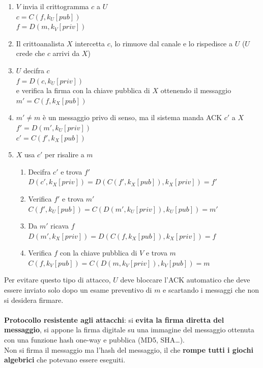 \documentclass[10pt]{book}
\begin{document}
\begin{enumerate}
	\item $V$ invia il crittogramma $c$ a $U$\\
	$c = C(f, k_U[pub])$\\
	$f = D(m, k_V[priv])$
	\item Il crittoanalista $X$ intercetta $c$, lo rimuove dal canale e lo rispedisce a $U$ ($U$ crede che $c$ arrivi da $X$)
	\item $U$ decifra $c$\\
	$f = D(c, k_U[priv])$\\
	e verifica la firma con la chiave pubblica di $X$ ottenendo il messaggio\\
	$m' = C(f, k_X[pub])$
	\item $m'\neq m$ è un messaggio privo di senso, ma il sistema manda ACK $c'$ a $X$\\
	$f' = D(m', k_U[priv])$\\
	$c' = C(f', k_X[pub])$
	\item $X$ usa $c'$ per risalire a $m$
	\begin{enumerate}
		\item Decifra $c'$ e trova $f'$\\
		$D(c',k_X[priv])=D(C(f',k_X[pub]), k_X[priv]) = f'$
		\item Verifica $f'$ e trova $m'$\\
		$C(f',k_U[pub]) = C(D(m',k_U[priv]),k_U[pub]) = m'$
		\item Da $m'$ ricava $f$\\
		$D(m',k_X[priv]) = D(C(f,k_X[pub]), k_X[priv]) = f$
		\item Verifica $f$ con la chiave pubblica di $V$ e trova $m$\\
		$C(f,k_V[pub]) = C(D(m,k_V[priv]),k_V[pub]) = m$	
	\end{enumerate}
\end{enumerate}
Per evitare questo tipo di attacco, $U$ deve bloccare l'ACK automatico che deve essere inviato solo dopo un esame preventivo di $m$ e scartando i messaggi che non si desidera firmare.\\\\
\textbf{Protocollo resistente agli attacchi}: si \textbf{evita la firma diretta del messaggio}, si appone la firma digitale su una immagine del messaggio ottenuta con una funzione hash one-way e pubblica (MD5, SHA\ldots).\\
Non si firma il messaggio ma l'hash del messaggio, il che \textbf{rompe tutti i giochi algebrici} che potevano essere eseguiti.
\end{document}
